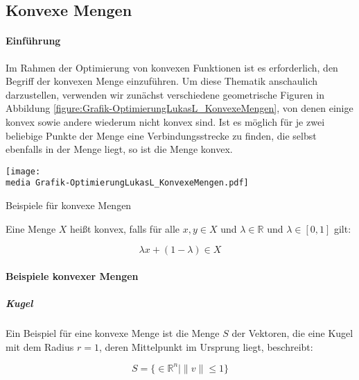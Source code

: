 \subsection{Konvexe Mengen}

\paragraph{Einführung}

Im Rahmen der Optimierung von konvexen Funktionen ist es erforderlich, den Begriff der konvexen Menge einzuführen. Um diese Thematik anschaulich darzustellen, verwenden wir zunächst verschiedene geometrische Figuren in Abbildung \ref{figure:Grafik-OptimierungLukasL_KonvexeMengen}, von denen einige konvex sowie andere wiederum nicht konvex sind.
Ist es möglich für je zwei beliebige Punkte der Menge eine Verbindungsstrecke zu finden, die selbst ebenfalls in der Menge liegt, so ist die Menge konvex.

\begin{dsafigure}
\begin{center}
\texttt{[image: \\media Grafik-OptimierungLukasL\_KonvexeMengen.pdf]}
\label{figure:Grafik-OptimierungLukasL_KonvexeMengen}
\caption{Beispiele für konvexe Mengen}
\end{center}
\end{dsafigure}

\begin{Def}

Eine Menge $X$ heißt konvex, falls für alle $x, y \in X$ und $\lambda \in \mathbb{R}$ und $\lambda \in [0,1]$ gilt:

\begin{equation}
\lambda x + (1 - \lambda) \in X
\end{equation}

\end{Def}

\paragraph{Beispiele konvexer Mengen}

\subparagraph{Kugel}

Ein Beispiel für eine konvexe Menge ist die Menge $S$ der Vektoren, die eine Kugel mit dem Radius $r = 1$, deren Mittelpunkt im Ursprung liegt, beschreibt:

\begin{equation*}
S = \{ \in \mathbb{R}^{n} | \lVert v\rVert \le 1\}
\end{equation*}

